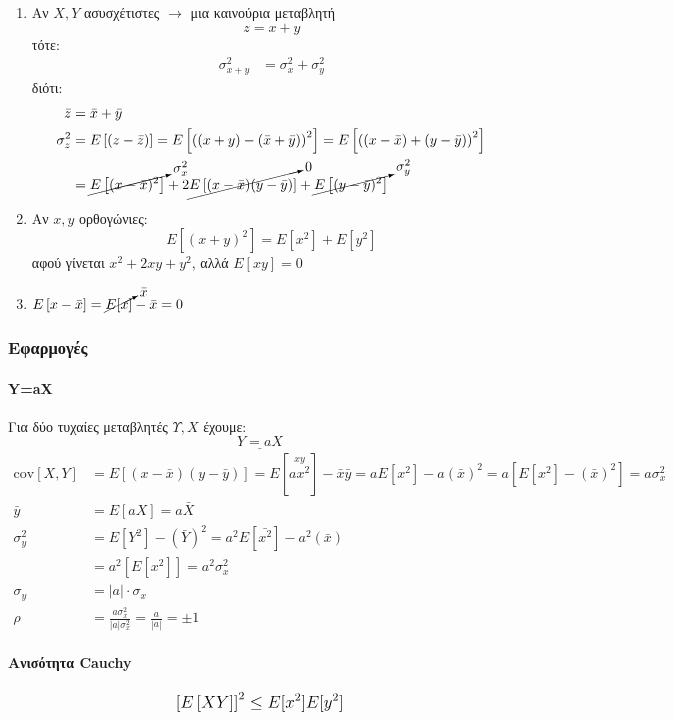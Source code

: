 \documentclass[11pt,a4paper,notitlepage,fleqn,draft]{article}
\begin{document}
\begin{enumerate}
	
	\item
	Αν \( X,Y \) ασυσχέτιστες \( \rightarrow \) μια καινούρια
	μεταβλητή \[
	z = x+y
	\] τότε: 
	\begin{align*}
	\sigma_{x+y}^2 &= \sigma_x^2+\sigma_y^2
	\end{align*}
	διότι: \begin{align*}
	\bar z &= \bar x + \bar y \\
	\sigma_z^2 &= E\left[(z-\bar z)\right] = E\left[
	\left((x+y)-(\bar x+\bar y)\right)^2
	\right]
	= E\left[
	\left((x-\bar x)+(y-\bar y)\right)^2
	\right] \\ &=
	\cancelto{\sigma_x^2}{E\left[(x-\bar x)^2\right]}
	+ 2\cancelto{0}{E\left[(x-\bar x)(y-\bar y)\right]}
	+ \cancelto{\sigma_y^2}{E\left[(y-\bar y)^2\right]}
	\end{align*}
	\item Αν \( x,y \) ορθογώνιες:
	\[
	E\left[(x+y)^2\right] = E[x^2]+E[y^2]
	\] αφού γίνεται \( x^2+2xy+y^2 \), αλλά \( E[xy]=0 \)
	\item \( \displaystyle
	E\left[x-\bar x\right] = \cancelto{\bar x}{E[x]} - \bar x
	= 0
	\)
\end{enumerate}

\subsubsection{Εφαρμογές}

\paragraph{Y=aX}
Για δύο τυχαίες μεταβλητές \( Υ,Χ \) έχουμε:
\[
\underline{Y= aX}
\]
\begin{align*}
	\mathrm{cov}[X,Y] &= E\left[(x-\bar x)(y-\bar y)\right]
	= E\left[\overset{xy}{ax^2}\right] - \bar x \bar y
	= aE[x^2]-a(\bar x)^2 = a\left[E[x^2]-(\bar x)^2\right]
	= a\sigma_x^2 \\
	\bar{y} &= E\left[ aX \right] = a \bar{X} \\
	\sigma_y^2 &= E\left[ Y^2 \right] - \left( \bar{Y} \right)^2
	= a^2 E \left[ \bar{x^2} \right] - a^2\left(\bar{x}\right) 
	\\ &= a^2\left[E\left[x^2\right]\right] = a^2\sigma_x^2 \\
	\sigma_y &= |a|\cdot\sigma_x \\
	\rho &= \frac{a\sigma_x^2}{|a|\sigma_x^2} = \frac{a}{|a|} = \pm 1
\end{align*}

\paragraph{Ανισότητα Cauchy}
\[
\mathlarger{\left[E\left[XY\right]\right]^2 \leq
E[x^2]E[y^2]}
\]
\end{document}
